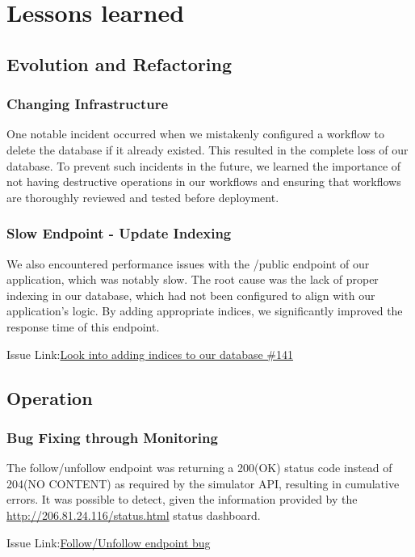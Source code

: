\section{Lessons learned}
\subsection{Evolution and Refactoring}

\subsubsection{Changing Infrastructure}
One notable incident occurred when we mistakenly configured a workflow to delete the database if it already existed. This resulted in the complete loss of our database. To prevent such incidents in the future, we learned the importance of not having destructive operations in our workflows and ensuring that workflows are thoroughly reviewed and tested before deployment.

\subsubsection{Slow Endpoint - Update Indexing}
We also encountered performance issues with the /public endpoint of our application, which was notably slow. The root cause was the lack of proper indexing in our database, which had not been configured to align with our application's logic. By adding appropriate indices, we significantly improved the response time of this endpoint.

Issue Link:\href{https://github.com/DevopsGroupC/Minitwit/issues/141}{\color{blue}Look into adding indices to our database \#141}

\subsection{Operation}

\subsubsection{Bug Fixing through Monitoring}
The follow/unfollow endpoint was returning a 200(OK) status code instead of 204(NO CONTENT) as required by the simulator API, resulting in cumulative errors. It was possible to detect, given the information provided by the \href{http://206.81.24.116/status.html}{http://206.81.24.116/status.html} status dashboard.

Issue Link:\href{https://github.com/DevopsGroupC/Minitwit/wiki/Week-11}{\color{blue}Follow/Unfollow endpoint bug}

